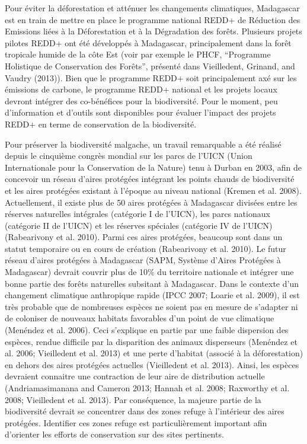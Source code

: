 \documentclass[12pt,]{article}
\begin{document}
Pour éviter la déforestation et atténuer les changements climatiques,
Madagascar est en train de mettre en place le programme national REDD+
de Réduction des Emissions liées à la Déforestation et à la Dégradation
des forêts. Plusieurs projets pilotes REDD+ ont été développés à
Madagascar, principalement dans la forêt tropicale humide de la côte Est
(voir par exemple le PHCF, ``Programme Holistique de Conservation des
Forêts'', présenté dans Vieilledent, Grinand, and Vaudry (2013)). Bien
que le programme REDD+ soit principalement axé sur les émissions de
carbone, le programme REDD+ national et les projets locaux devront
intégrer des co-bénéfices pour la biodiversité. Pour le moment, peu
d'information et d'outils sont disponibles pour évaluer l'impact des
projets REDD+ en terme de conservation de la biodiversité.

Pour préserver la biodiversité malgache, un travail remarquable a été
réalisé depuis le cinquième congrès mondial sur les parcs de l'UICN
(Union Internationale pour la Conservation de la Nature) tenu à Durban
en 2003, afin de concevoir un réseau d'aires protégées intégrant les
points chauds de biodiversité et les aires protégées existant à l'époque
au niveau national (Kremen et al. 2008). Actuellement, il existe plus de
50 aires protégées à Madagascar divisées entre les réserves naturelles
intégrales (catégorie I de l'UICN), les parcs nationaux (catégorie II de
l'UICN) et les réserves spéciales (catégorie IV de l'UICN) (Rabearivony
et al. 2010). Parmi ces aires protégées, beaucoup sont dans un statut
temporaire ou en cours de création (Rabearivony et al. 2010). Le futur
réseau d'aires protégées à Madagascar (SAPM, Système d'Aires Protégées à
Madagascar) devrait couvrir plus de 10\% du territoire nationale et
intégrer une bonne partie des forêts naturelles subsitant à Madagascar.
Dans le contexte d'un changement climatique anthropique rapide (IPCC
2007; Loarie et al. 2009), il est très probable que de nombreuses
espèces ne soient pas en mesure de s'adapter ni de coloniser de nouveaux
habitats favorables d'un point de vue climatique (Menéndez et al. 2006).
Ceci s'explique en partie par une faible dispersion des espèces, rendue
difficile par la disparition des animaux disperseurs (Menéndez et al.
2006; Vieilledent et al. 2013) et une perte d'habitat (associé à la
déforestation) en dehors des aires protégées actuelles (Vieilledent et
al. 2013). Ainsi, les espèces devraient connaitre une contraction de
leur aire de distribution actuelle (Andriamasimanana and Cameron 2013;
Hannah et al. 2008; Raxworthy et al. 2008; Vieilledent et al. 2013). Par
conséquence, la majeure partie de la biodiversité devrait se concentrer
dans des zones refuge à l'intérieur des aires protégées. Identifier ces
zones refuge est particulièrement important afin d'orienter les efforts
de conservation sur des sites pertinents.
\end{document}
